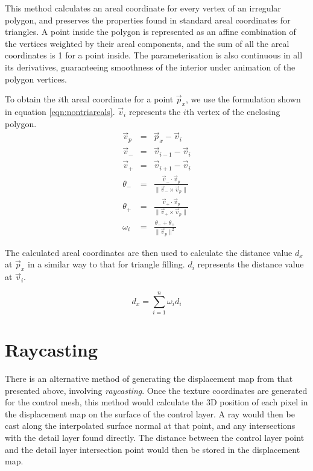 This method calculates an areal coordinate for every vertex of an irregular polygon, and preserves the properties found in standard areal coordinates for triangles. A point inside the polygon is represented as an affine combination of the vertices weighted by their areal components, and the sum of all the areal coordinates is 1 for a point inside. The parameterisation is also continuous in all its derivatives, guaranteeing smoothness of the interior under animation of the polygon vertices.

To obtain the $i$th areal coordinate for a point $\vec{p}_x$, we use the formulation shown in equation \ref{eqn:nontriareals}. $\vec{v}_i$ represents the $i$th vertex of the enclosing polygon.
\begin{eqnarray}
\label{eqn:nontriareals}
\vec{v}_p & = & \vec{p}_x - \vec{v}_i \nonumber \\
\vec{v}_- & = & \vec{v}_{i-1} - \vec{v}_i \nonumber \\
\vec{v}_+ & = & \vec{v}_{i+1} - \vec{v}_i \nonumber \\
\theta_- & = & \frac{\vec{v}_- \cdot \vec{v}_p}{\| \vec{v}_- \times \vec{v}_p \|} \nonumber \\
\theta_+ & = & \frac{\vec{v}_+ \cdot \vec{v}_p}{\| \vec{v}_+ \times \vec{v}_p \|} \nonumber \\
\omega_i & = & \frac{\theta_- + \theta_+}{\| \vec{v}_p \| ^2}
\end{eqnarray}

The calculated areal coordinates are then used to calculate the distance value $d_x$ at $\vec{p}_x$ in a similar way to that for triangle filling. $d_i$ represents the distance value at $\vec{v}_i$.

\begin{equation}
\label{eqn:polygonfilling}
d_x = \sum_{i=1}^n \omega_id_i
\end{equation}

\section{\label{sec:dispmapcreation:raycasting}Raycasting}

There is an alternative method of generating the displacement map from that presented above, involving {\it raycasting}. Once the texture coordinates are generated for the control mesh, this method would calculate the 3D position of each pixel in the displacement map on the surface of the control layer. A ray would then be cast along the interpolated surface normal at that point, and any intersections with the detail layer found directly. The distance between the control layer point and the detail layer intersection point would then be stored in the displacement map. 

